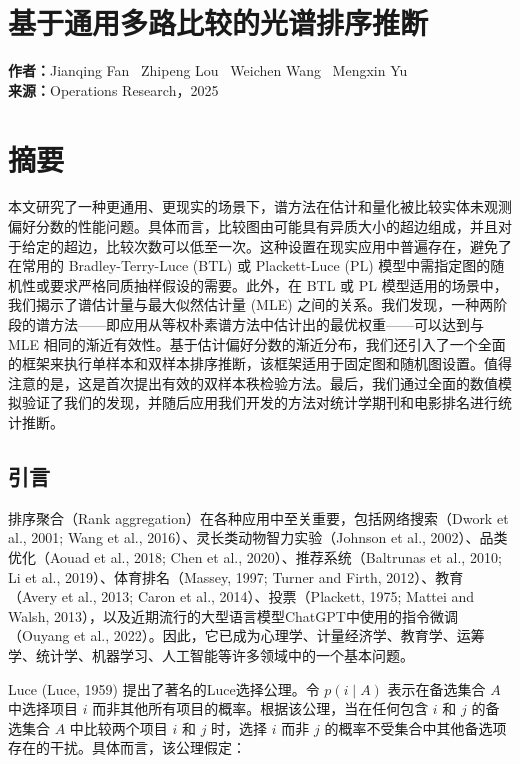 

\section{基于通用多路比较的光谱排序推断}	

\textbf{作者：}Jianqing Fan \ Zhipeng Lou \ Weichen Wang \ Mengxin Yu \\
\textbf{来源：}Operations Research，2025\\

\section*{摘要}\label{abstract}

本文研究了一种更通用、更现实的场景下，谱方法在估计和量化被比较实体未观测偏好分数的性能问题。具体而言，比较图由可能具有异质大小的超边组成，并且对于给定的超边，比较次数可以低至一次。这种设置在现实应用中普遍存在，避免了在常用的 Bradley-Terry-Luce (BTL) 或 Plackett-Luce (PL) 模型中需指定图的随机性或要求严格同质抽样假设的需要。此外，在 BTL 或 PL 模型适用的场景中，我们揭示了谱估计量与最大似然估计量 (MLE) 之间的关系。我们发现，一种两阶段的谱方法——即应用从等权朴素谱方法中估计出的最优权重——可以达到与 MLE 相同的渐近有效性。基于估计偏好分数的渐近分布，我们还引入了一个全面的框架来执行单样本和双样本排序推断，该框架适用于固定图和随机图设置。值得注意的是，这是首次提出有效的双样本秩检验方法。最后，我们通过全面的数值模拟验证了我们的发现，并随后应用我们开发的方法对统计学期刊和电影排名进行统计推断。


\subsection{引言}

排序聚合（Rank aggregation）在各种应用中至关重要，包括网络搜索（Dwork et al., 2001; Wang et al., 2016）、灵长类动物智力实验（Johnson et al., 2002）、品类优化（Aouad et al., 2018; Chen et al., 2020）、推荐系统（Baltrunas et al., 2010; Li et al., 2019）、体育排名（Massey, 1997; Turner and Firth, 2012）、教育（Avery et al., 2013; Caron et al., 2014）、投票（Plackett, 1975; Mattei and Walsh, 2013），以及近期流行的大型语言模型ChatGPT中使用的指令微调（Ouyang et al., 2022）。因此，它已成为心理学、计量经济学、教育学、运筹学、统计学、机器学习、人工智能等许多领域中的一个基本问题。

Luce (Luce, 1959) 提出了著名的Luce选择公理。令 $p(i\mid A)$ 表示在备选集合 $A$ 中选择项目 $i$ 而非其他所有项目的概率。根据该公理，当在任何包含 $i$ 和 $j$ 的备选集合 $A$ 中比较两个项目 $i$ 和 $j$ 时，选择 $i$ 而非 $j$ 的概率不受集合中其他备选项存在的干扰。具体而言，该公理假定：

